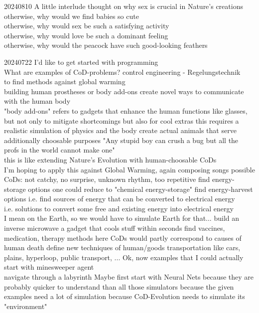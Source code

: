 \documentclass{article}\usepackage[margin=2cm]{geometry}
\begin{document}
\begin{cascade}
    20240810
    \stepin
    A little interlude thought on why sex is crucial in Nature's creations
    \stepin
    otherwise, why would we find babies so cute\\
    otherwise, why would sex be such a satisfying activity\\
    otherwise, why would love be such a dominant feeling\\
    otherwise, why would the peacock have such good-looking feathers
\end{cascade}
\begin{cascade}
    20240722
    \stepin
    I'd like to get started with programming\\
    What are examples of CoD-problems?
    \stepin
    control engineering - Regelungstechnik\\
    to find methods against global warming\\
    building human prostheses or body add-ons
    \stepin
    create novel ways to communicate with the human body\\
    "body add-ons" refers to gadgets that enhance the human functions
    \stepin
    like glasses, but not only to mitigate shortcomings but also for cool extras
    \stepout
    this requires a realistic simulation of physics and the body
    \stepout
    create actual animals that serve additionally choosable purposes
    \stepin
    "Any stupid boy can crush a bug but all the profs in the world cannot make one"\\
    this is like extending Nature's Evolution with human-choosable CoDs\\
    I'm hoping to apply this against Global Warming, again
    \stepout
    composing songs
    \stepin
    possible CoDs: not catchy, no surprise, unknown rhythm, too repetitive
    \stepout
    find energy-storage options
    \stepin
    one could reduce to "chemical energy-storage"
    \stepout
    find energy-harvest options
    \stepin
    i.e. find sources of energy that can be converted to electrical energy\\
    i.e. solutions to convert some free and existing energy into electrical energy\\
    I mean on the Earth, so we would have to simulate Earth for that...
    \stepout
    build an inverse microwave
    \stepin
    a gadget that cools stuff within seconds
    \stepout
    find vaccines, medication, therapy methods
    \stepin
    here CoDs would partly correspond to causes of human death
    \stepout
    define new techniques of human/goods transportation
    \stepin
    like cars, plains, hyperloop, public transport, ...
    \stepout
    \stepout
    Ok, now examples that I could actually start with
    \stepin
    minesweeper agent\\
    navigate through a labyrinth
    \stepout
    Maybe first start with Neural Nets
    \stepin
    because they are probably quicker to understand than all those simulators
    \stepin
    because the given examples need a lot of simulation
    \stepin
    because CoD-Evolution needs to simulate its "environment"
\end{cascade}
\end{document}
